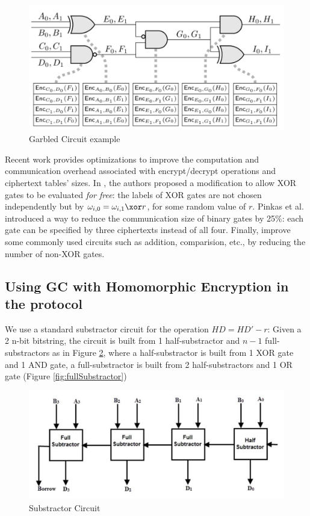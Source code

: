 \begin{figure}[htbp!] 
  \centering    
  \includegraphics[width=1.0\textwidth]{Chapter2/Figs/Raster/garbledCircuit}
  \caption{Garbled Circuit example}
  \label{fig:garbledCircuit}
\end{figure}

Recent work provides optimizations to improve the computation and communication
overhead associated with encrypt/decrypt operations and ciphertext tables'
sizes. In \cite{kolesnikov2008improved30}, the authors proposed a modification
to allow XOR gates to be evaluated \textit{for free}: the labels of XOR gates
are not chosen independently but by \(\omega_{i,0} = \omega_{i,1} \xor r\), for
some random value of \(r\). Pinkas et al. \cite{pinkas2009secure38} introduced a
way to reduce the communication size of binary gates by 25\%: each gate can be
specified by three ciphertexts instead of all four. Finally,
\cite{kolesnikov2009improved29} improve some commonly used circuits such as
addition, comparision, etc., by reducing the number of non-XOR gates.

\subsection{Using GC with Homomorphic Encryption in the protocol}
\label{sec:finalcontr}
We use a standard substractor circuit for the operation \(HD = HD' - r\): Given
a 2 n-bit bitstring, the circuit is built from 1 half-substractor and \(n-1\)
full-substractors as in Figure \ref{fig:substractor}, where a half-substractor
is built from 1 XOR gate and 1 AND gate, a full-substractor is built from 2
half-substractors and 1 OR gate (Figure \ref{fig:fullSubstractor})

\begin{figure}[htbp!] 
  \centering    
  \includegraphics[width=1.0\textwidth]{Chapter7/Figs/Raster/subCircuit}
  \caption{Substractor Circuit}
  \label{fig:substractor}
\end{figure}



